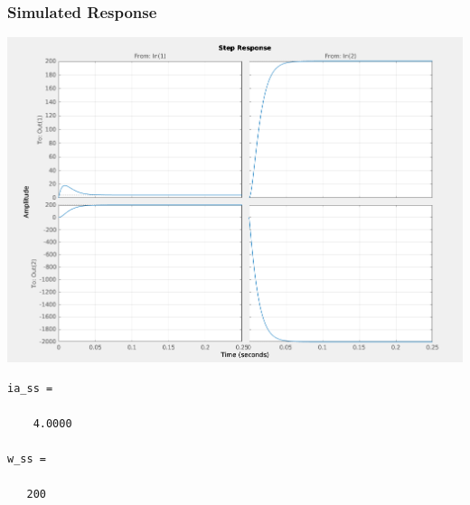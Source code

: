 \documentclass[fleqn]{beamer}                  %
\newcommand{\sectiontitleV}{Simulated Response}
\begin{document}
	\begin{frame}[containsverbatim,label=sectionV] \small
		\frametitle{\sectiontitleV}
		
		\begin{multicols}{2}

		\includegraphics[scale=0.25]{dc_motor_state_space_figure1.png}	

		\begin{lstlisting}
ia_ss =

    4.0000

w_ss =

   200
		\end{lstlisting}

		\end{multicols}

	\end{frame}
\end{document}
